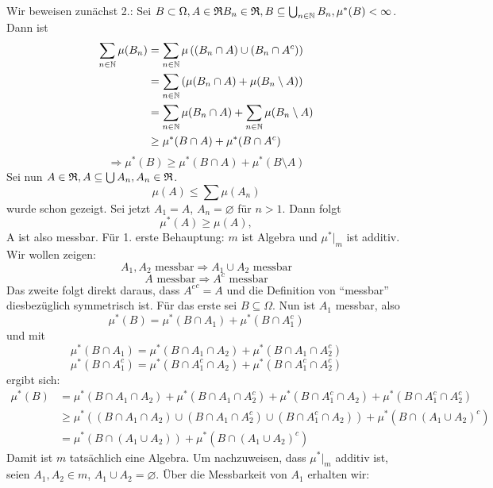 			\begin{bew}
				Wir beweisen zunächst 2.:\newline
				Sei $B\subset\Omega, A\in\mathfrak{R} B_n\in\mathfrak{R}, B\subseteq \bigcup_{n\in\mathbb{N}} B_n, \mu^*(B)<\infty$. Dann ist
				\begin{align*}
				\sum_{n\in\mathbb{N}}\mu(B_n)&=\sum_{n\in\mathbb{N}}\mu\left((B_n\cap A)\cup(B_n\cap A^c)\right)\\
				&=\sum_{n\in\mathbb{N}} \left(\mu(B_n\cap A)+\mu(B_n\setminus A)\right)\\
				&=\sum_{n\in\mathbb{N}}\mu(B_n\cap A)+\sum_{n\in\mathbb{N}} \mu(B_n\setminus A)\\
				&\ge \mu^*(B\cap A)+\mu^*(B\cap A^c)
				\end{align*}
				\[ \Rightarrow \mu^*(B)\ge \mu^*(B\cap A)+\mu^*(B\setminus A) \]
				\arge
				Sei nun $A\in \mathfrak{R}, A\subseteq \bigcup A_n, A_n\in\mathfrak{R}$. 
				\[ \mu(A)\le \sum \mu(A_n) \]
				wurde schon gezeigt. Sei jetzt $A_1=A$, $A_n=\varnothing$ für $n>1$. Dann folgt 
				\[ \mu^*(A)\ge\mu(A), \]
				A ist also messbar.\newline\newline
				Für 1. erste Behauptung: $m$ ist Algebra und $\mu^*|_m$ ist additiv. Wir wollen zeigen:
				\[ A_1,A_2\text{ messbar}\Rightarrow A_1\cup A_2 \text{ messbar} \]
				\[ A \text{ messbar}\Rightarrow A^c \text{ messbar} \]
				Das zweite folgt direkt daraus, dass ${A^c}^c=A$ und die Definition von "`messbar"' diesbezüglich symmetrisch ist. \newline
				Für das erste sei $B\subseteq\Omega$. Nun ist $A_1$ messbar, also
				\[ \mu^*(B)=\mu^*(B\cap A_1)+\mu^*(B\cap A_1^c) \]
				und mit
				\[ \mu^*(B\cap A_1)=\mu^*(B\cap A_1\cap A_2)+\mu^*(B\cap A_1\cap A_2^c) \]
				\[ \mu^*(B\cap A_1^c)=\mu^* (B\cap A_1^c\cap A_2)+\mu^*(B\cap A_1^c\cap A_2^c) \]
				ergibt sich:
				\begin{align*}
				\mu^*(B)&=\mu^*(B\cap A_1\cap A_2)+\mu^*(B\cap A_1\cap A_2^c)+\mu^* (B\cap A_1^c\cap A_2)+\mu^*(B\cap A_1^c\cap A_2^c)\\
				&\ge \mu^*\left((B\cap A_1\cap A_2)\cup(B\cap A_1\cap A_2^c)\cup (B\cap A_1^c\cap A_2)\right)+ \mu^*(B\cap (A_1\cup A_2)^c)\\
				&=\mu^*(B\cap(A_1\cup A_2))+\mu^*(B\cap (A_1\cup A_2)^c)
				\end{align*}
				Damit ist $m$ tatsächlich eine Algebra.\newline
				Um nachzuweisen, dass $\mu^*|_m$ additiv ist, seien $A_1, A_2\in m$, $A_1\cup A_2=\varnothing$. Über die Messbarkeit von $A_1$ erhalten wir:

\end{bew}
